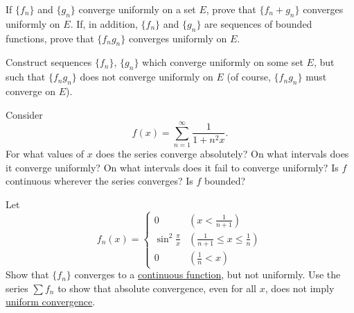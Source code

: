   \begin{exercise}[Rudin 7.2]
    If $\{f_n\}$ and $\{g_n\}$ converge uniformly on a set $E$, prove that $\{f_n + g_n\}$ converges uniformly on $E$. If, in addition, $\{f_n\}$ and $\{g_n\}$ are sequences of bounded functions, prove that $\{f_n g_n\}$ converges uniformly on $E$.
  \end{exercise}
  \begin{solution}

  \end{solution}

  \begin{exercise}[Rudin 7.3]
    Construct sequences $\{f_n\}$, $\{g_n\}$ which converge uniformly on some set $E$, but such that $\{f_n g_n\}$ does not converge uniformly on $E$ (of course, $\{f_n g_n\}$ must converge on $E$).
  \end{exercise}
  \begin{solution}

  \end{solution}

  \begin{exercise}[Rudin 7.4]
    Consider
    \begin{equation}
      f(x) = \sum_{n=1}^{\infty} \frac{1}{1 + n^2 x}.
    \end{equation}
    For what values of $x$ does the series converge absolutely? On what intervals does it converge uniformly? On what intervals does it fail to converge uniformly? Is $f$ continuous wherever the series converges? Is $f$ bounded?
  \end{exercise}
  \begin{solution}

  \end{solution}

  \begin{exercise}[Rudin 7.5]
    Let
    \begin{equation}
      f_n(x) = 
      \begin{cases} 
        0 & (x < \frac{1}{n+1}) \\
        \sin^2 \frac{\pi}{x} & (\frac{1}{n+1} \le x \le \frac{1}{n}) \\
        0 & (\frac{1}{n} < x)
      \end{cases}
    \end{equation}
    Show that $\{f_n\}$ converges to a \hyperref[pst-def:continuous_func]{continuous function}, but not uniformly. Use the series $\sum f_n$ to show that absolute convergence, even for all $x$, does not imply \hyperref[def:uniform-convergence]{uniform convergence}.
  \end{exercise}
  \begin{solution}

  \end{solution}

